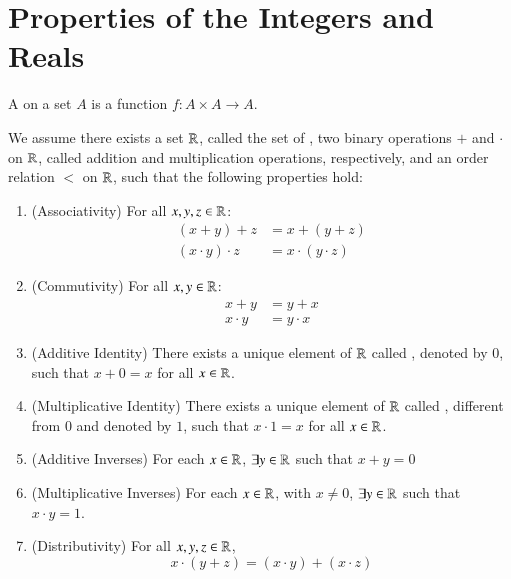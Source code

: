     \section{Properties of the Integers and Reals}


    \begin{definition}
        A  on a set $A$ is a function $f:A\times A\rightarrow A$.
    \end{definition}


    \begin{construction}
        We assume there exists a set $\mathbb R$, called the set of , two binary operations $+$ and $\cdot$ on $\mathbb R$, called addition and multiplication operations, respectively, and an order relation $<$ on $\mathbb R$, such that the following properties hold: \begin{enumerate}
            \item (Associativity) For all $x,y,z \in \mathbb R$:\begin{align}
                    (x+y)+z &= x+(y+z) \\
                    (x\cdot y)\cdot z &= x\cdot (y\cdot z) 
                \end{align}
            \item (Commutivity) For all $x,y \in \mathbb R$:\begin{align}
                x+y &= y+x \\
                x\cdot y &= y \cdot x
                \end{align}
            \item (Additive Identity) There exists a unique element of $\mathbb R$ called , denoted by $0$, such that $x+0 = x$ for all $x \in \mathbb R$.
            \item (Multiplicative Identity) There exists a unique element of $\mathbb R$ called , different from $0$ and denoted by $1$, such that $x\cdot 1 = x$ for all $x \in \mathbb R$.
            \item (Additive Inverses) For each $x \in\mathbb R$, $\exists y \in \mathbb R$ such that $x+y = 0$
            \item (Multiplicative Inverses) For each $x \in \mathbb R$, with $x \neq 0$, $\exists y \in \mathbb R$ such that $x\cdot y = 1$.
            \item (Distributivity) For all $x,y,z \in \mathbb R$, \begin{equation}
                    x\cdot (y+z) = (x\cdot y) + (x\cdot z)
                \end{equation}

\end{enumerate}
\end{construction}
